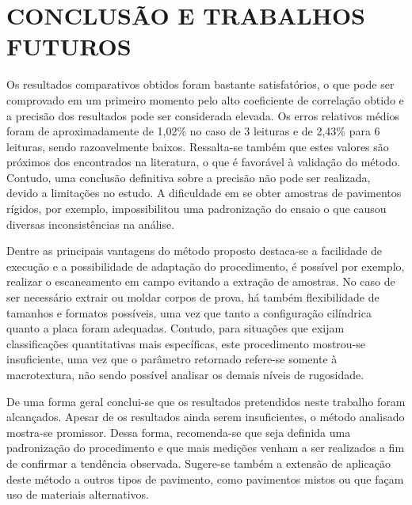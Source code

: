 \chapter{CONCLUSÃO E TRABALHOS FUTUROS}\label{CAP5}

Os resultados comparativos obtidos foram bastante satisfatórios, o que pode ser comprovado em um primeiro momento pelo alto coeficiente de correlação obtido e a precisão dos resultados pode ser considerada elevada. Os erros relativos médios foram de aproximadamente de 1,02\% no caso de 3 leituras e de 2,43\% para 6 leituras, sendo razoavelmente baixos. Ressalta-se também que estes valores são próximos dos encontrados na literatura, o que é favorável à validação do método. Contudo, uma conclusão definitiva sobre a precisão não pode ser realizada, devido a limitações no estudo. A dificuldade em se obter amostras de pavimentos rígidos, por exemplo, impossibilitou uma padronização do ensaio o que causou diversas inconsistências na análise. 

Dentre as principais vantagens do método proposto destaca-se a facilidade de execução e a possibilidade de adaptação do procedimento, é possível por exemplo, realizar o escaneamento em campo evitando a extração de amostras. No caso de ser necessário extrair ou moldar corpos de prova, há também flexibilidade de tamanhos e formatos possíveis, uma vez que tanto a configuração cilíndrica quanto a placa foram adequadas. Contudo, para situações que exijam classificações quantitativas mais específicas, este procedimento mostrou-se insuficiente, uma vez que o parâmetro retornado refere-se somente à macrotextura, não sendo possível analisar os demais níveis de rugosidade. 

De uma forma geral conclui-se que os resultados pretendidos neste trabalho foram alcançados. Apesar de os resultados ainda serem insuficientes, o método analisado mostra-se promissor. Dessa forma, recomenda-se que seja definida uma padronização do procedimento e que mais medições venham a ser realizados a fim de confirmar a tendência observada. Sugere-se também a extensão de aplicação deste método a outros tipos de pavimento, como pavimentos mistos ou que façam uso de materiais alternativos. 
